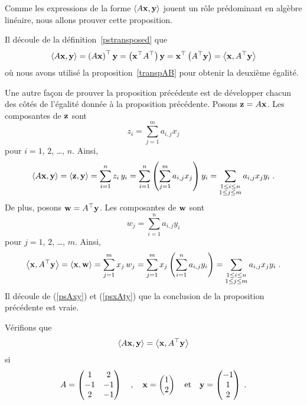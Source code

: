 {Comme les expressions de la forme $\left\langle{A\mathbf{x}} , {\mathbf{y}}\right\rangle$ jouent un
rôle prédominant en algèbre linéaire, nous allons prouver cette
proposition.

Il découle de la définition~\ref{pstransposed} que
\[
\left\langle{A\mathbf{x}} , {\mathbf{y}}\right\rangle = \left(A\mathbf{x}\right)^\top \mathbf{y}
= \left(\mathbf{x}^\top A^\top\right) \mathbf{y}
= \mathbf{x}^\top \left( A^\top \mathbf{y}\right)
= \left\langle{\mathbf{x}} , {A^\top \mathbf{y}}\right\rangle
\]
où nous avons utilisé la proposition~\ref{transpAB} pour obtenir la
deuxième égalité.

Une autre façon de prouver la proposition précédente est de développer
chacun des côtés de l'égalité donnée à la proposition précédente.
Posons $\mathbf{z} = A\mathbf{x}$.  Les composantes de $\mathbf{z}$ sont
\[
z_i = \sum_{j=1}^m a_{i,j}x_j
\]
pour $i=1$, $2$, \ldots , $n$.  Ainsi,
\begin{equation}\label{psAxy}
\left\langle{A\mathbf{x}} , {\mathbf{y}}\right\rangle = \left\langle{\mathbf{z}} , {\mathbf{y}}\right\rangle
= \sum_{i=1}^n z_i\,y_i
= \sum_{i=1}^n\left(\sum_{j=1}^m a_{i,j}x_j\right)y_i
= \sum_{\substack{1\leq i\leq n\\1\leq j \leq m}} a_{i,j} x_j y_i \; .
\end{equation}
De plus, posons $\mathbf{w} = A^\top\mathbf{y}$.  Les composantes de
$\mathbf{w}$ sont
\[
w_j = \sum_{i=1}^n a_{i,j}y_i
\]
pour $j=1$, $2$, \ldots , $m$.  Ainsi,
\begin{equation}\label{psxAty}
\left\langle{\mathbf{x}} , {A^\top\mathbf{y}}\right\rangle = \left\langle{\mathbf{x}} , {\mathbf{w}}\right\rangle
= \sum_{j=1}^m x_j\,w_j
= \sum_{j=1}^m x_j \left(\sum_{i=1}^n a_{i,j}y_i\right)
= \sum_{\substack{1\leq i\leq n\\1\leq j \leq m}} a_{i,j} x_j y_i \; .
\end{equation}
Il découle de (\ref{psAxy}) et (\ref{psxAty}) que la conclusion de la
proposition précédente est vraie.

\begin{egg}
Vérifions que
\[
\left\langle{A\mathbf{x}} , {\mathbf{y}}\right\rangle = \left\langle{\mathbf{x}} , {A^\top\mathbf{y}}\right\rangle
\]
si
\[
A = \begin{pmatrix} 1 & 2 \\ -1 & -1 \\ 2 & -1 \end{pmatrix} \quad ,
\quad
\mathbf{x} = \begin{pmatrix} 1 \\ 2 \end{pmatrix}
\quad \text{et} \quad
\mathbf{y} = \begin{pmatrix} -1 \\ 1 \\ 2 \end{pmatrix} \; .
\]


\end{egg}}

